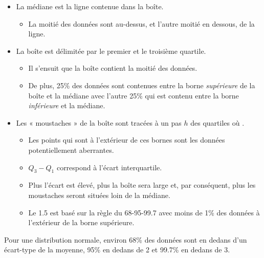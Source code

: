 \documentclass[10pt, french]{article}
\begin{document}
\begin{multicols*}{2}
\begin{itemize}
	\item	La médiane est la ligne contenue dans la boîte.
		\begin{itemize}
		\item	La moitié des données sont au-dessus, et l'autre moitié en dessous, de la ligne.
		\end{itemize}
	\item	La boîte est délimitée par le premier et le troisième quartile.
		\begin{itemize}
		\item	Il s'ensuit que la boîte contient la moitié des données.
		\item	De plus, 25\% des données sont contenues entre la borne \textit{supérieure} de la boîte et la médiane avec l'autre 25\% qui est contenu entre la borne \textit{inférieure} et la médiane.
		\end{itemize}
	\item	Les « moustaches » de la boîte sont tracées à un pas $h$ des quartiles où .
		\begin{itemize}
		\item	Les points qui sont à l'extérieur de ces bornes sont les données potentiellement aberrantes.
		\item	$Q_{3}	-	Q_{1}$ correspond à l'écart interquartile.
		\item	Plus l'écart est élevé, plus la boîte sera large et, par conséquent, plus les moustaches seront situées loin de la médiane.
		\item	Le 1.5 est basé sur la règle du 68-95-99.7 avec moins de 1\% des données à l'extérieur de la borne supérieure.
		\end{itemize}
\end{itemize}

\begin{definitionNOHFILLprop}[Règle du 68-95-99.7]
Pour une distribution normale, environ 68\% des données sont en dedans d'un écart-type de la moyenne, 95\% en dedans de 2 et 99.7\% en dedans de 3.

\begin{center}
		

\begin{tikzpicture}[x=0.75pt,y=0.75pt,yscale=-1,xscale=1]


\end{tikzpicture}
\end{center}
\end{definitionNOHFILLprop}
\end{multicols*}
\end{document}
